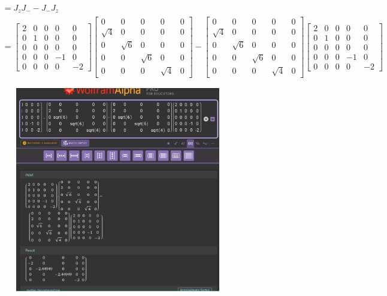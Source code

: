 \documentclass[letter, 10pts]{article}
\begin{document}
\newpage 
\begin{align*}
	[J_z, J_-] &= 
J_z J_- - J_- J_z 
	\\
		   &= 
		   \begin{bmatrix}
2 & 0 & 0 & 0 & 0 \\
0 & 1 & 0 & 0 & 0 \\
0 & 0 & 0 & 0 & 0 \\
0 & 0 & 0 & -1 & 0 \\
0 & 0 & 0 & 0 & -2
\end{bmatrix} 
\begin{bmatrix}
0 & 0 & 0 & 0 & 0 \\
\sqrt{4} & 0 & 0 & 0 & 0 \\
0 & \sqrt{6} & 0 & 0 & 0 \\
0 & 0 & \sqrt{6} & 0 & 0 \\
0 & 0 & 0 & \sqrt{4} & 0
\end{bmatrix}
-
\begin{bmatrix}
0 & 0 & 0 & 0 & 0 \\
\sqrt{4} & 0 & 0 & 0 & 0 \\
0 & \sqrt{6} & 0 & 0 & 0 \\
0 & 0 & \sqrt{6} & 0 & 0 \\
0 & 0 & 0 & \sqrt{4} & 0
\end{bmatrix}
		   \begin{bmatrix}
2 & 0 & 0 & 0 & 0 \\
0 & 1 & 0 & 0 & 0 \\
0 & 0 & 0 & 0 & 0 \\
0 & 0 & 0 & -1 & 0 \\
0 & 0 & 0 & 0 & -2
\end{bmatrix} 
\end{align*}
\begin{figure}[H]
	\centering
	\includegraphics[width=0.8\textwidth]{./ss/11/2.png}
	\caption{}
	\label{fig:}
\end{figure}
\end{document}
